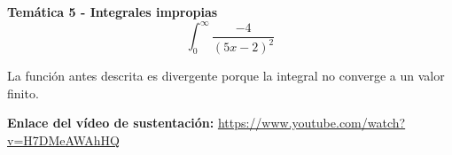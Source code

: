 \textbf{Temática 5 - Integrales impropias}
\[\int_{0}^{\infty}\frac{-4}{(5x-2)^2}\]

La función antes descrita es divergente porque la integral no converge a un valor finito.

\textbf{Enlace del vídeo de sustentación:} \href{https://www.youtube.com/watch?v=H7DMeAWAhHQ}{https://www.youtube.com/watch?v=H7DMeAWAhHQ}